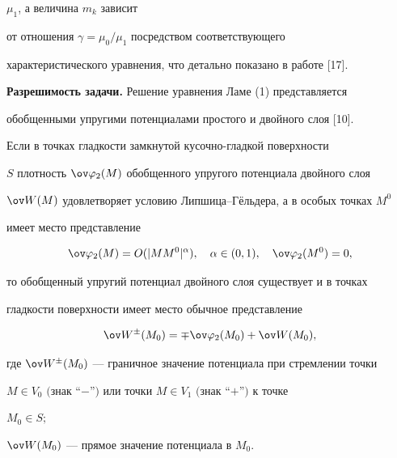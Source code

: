 $\mu_1$, а величина $m_k$ зависит  


от отношения $\gamma=\mu_0/\mu_1$ посредством соответствующего 


характеристического уравнения, что детально показано в работе [17]. 


\medskip 


 


{\bf Разрешимость задачи.} Решение уравнения Ламе (1) представляется  


обобщенными упругими потенциалами простого и двойного слоя [10].  


 


\begin{lem} 


Если в точках гладкости замкнутой кусочно-гладкой поверхности  


$S$ плотность $\ov\varphi_2(M)$ обобщенного упругого потенциала двойного слоя  


$\ov W(M)$ удовлетворяет условию Липшица--Г\"ельдера, а в особых точках $M^0$ 


имеет место представление 


\begin{equation} 


\ov\varphi_2(M)=O(|MM^0|^\alpha),\quad \alpha\in(0,1),\quad 


\ov\varphi_2(M^0)=0, 


\end{equation} 


то обобщенный упругий потенциал двойного слоя существует и в точках  


гладкости поверхности имеет место обычное представление 


\begin{equation} 


\ov W{}^\pm(M_0)=\mp\ov\varphi_2(M_0)+\ov W(M_0), 


\end{equation} 


где $\ov W{}^\pm(M_0)$ --- граничное значение потенциала при стремлении точки  


$M\in V_0$ $($знак ``$-$''$)$ или точки $M\in V_1$ $($знак ``$+$''$)$ к точке 


$M_0\in S;$ 


$\ov W(M_0)$ --- прямое значение потенциала в $M_0$. 


\end{lem} 


